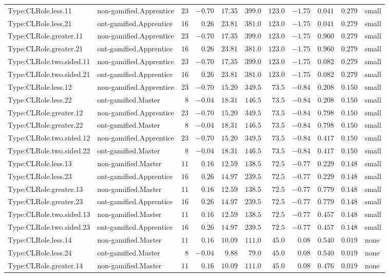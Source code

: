 \documentclass[6pt,a4paper]{article}
\begin{document}
{\begin{longtable}{llrrrrrrrrl}
Type:CLRole.less.11&non-gamified.Apprentice&$23$&$-0.70$&$17.35$&$399.0$&$123.0$&$-1.75$&$0.041$&$0.279$&small\tabularnewline
Type:CLRole.less.21&ont-gamified.Apprentice&$16$&$ 0.26$&$23.81$&$381.0$&$123.0$&$-1.75$&$0.041$&$0.279$&small\tabularnewline
Type:CLRole.greater.11&non-gamified.Apprentice&$23$&$-0.70$&$17.35$&$399.0$&$123.0$&$-1.75$&$0.960$&$0.279$&small\tabularnewline
Type:CLRole.greater.21&ont-gamified.Apprentice&$16$&$ 0.26$&$23.81$&$381.0$&$123.0$&$-1.75$&$0.960$&$0.279$&small\tabularnewline
Type:CLRole.two.sided.11&non-gamified.Apprentice&$23$&$-0.70$&$17.35$&$399.0$&$123.0$&$-1.75$&$0.082$&$0.279$&small\tabularnewline
Type:CLRole.two.sided.21&ont-gamified.Apprentice&$16$&$ 0.26$&$23.81$&$381.0$&$123.0$&$-1.75$&$0.082$&$0.279$&small\tabularnewline
Type:CLRole.less.12&non-gamified.Apprentice&$23$&$-0.70$&$15.20$&$349.5$&$ 73.5$&$-0.84$&$0.208$&$0.150$&small\tabularnewline
Type:CLRole.less.22&ont-gamified.Master&$ 8$&$-0.04$&$18.31$&$146.5$&$ 73.5$&$-0.84$&$0.208$&$0.150$&small\tabularnewline
Type:CLRole.greater.12&non-gamified.Apprentice&$23$&$-0.70$&$15.20$&$349.5$&$ 73.5$&$-0.84$&$0.798$&$0.150$&small\tabularnewline
Type:CLRole.greater.22&ont-gamified.Master&$ 8$&$-0.04$&$18.31$&$146.5$&$ 73.5$&$-0.84$&$0.798$&$0.150$&small\tabularnewline
Type:CLRole.two.sided.12&non-gamified.Apprentice&$23$&$-0.70$&$15.20$&$349.5$&$ 73.5$&$-0.84$&$0.417$&$0.150$&small\tabularnewline
Type:CLRole.two.sided.22&ont-gamified.Master&$ 8$&$-0.04$&$18.31$&$146.5$&$ 73.5$&$-0.84$&$0.417$&$0.150$&small\tabularnewline
Type:CLRole.less.13&non-gamified.Master&$11$&$ 0.16$&$12.59$&$138.5$&$ 72.5$&$-0.77$&$0.229$&$0.148$&small\tabularnewline
Type:CLRole.less.23&ont-gamified.Apprentice&$16$&$ 0.26$&$14.97$&$239.5$&$ 72.5$&$-0.77$&$0.229$&$0.148$&small\tabularnewline
Type:CLRole.greater.13&non-gamified.Master&$11$&$ 0.16$&$12.59$&$138.5$&$ 72.5$&$-0.77$&$0.779$&$0.148$&small\tabularnewline
Type:CLRole.greater.23&ont-gamified.Apprentice&$16$&$ 0.26$&$14.97$&$239.5$&$ 72.5$&$-0.77$&$0.779$&$0.148$&small\tabularnewline
Type:CLRole.two.sided.13&non-gamified.Master&$11$&$ 0.16$&$12.59$&$138.5$&$ 72.5$&$-0.77$&$0.457$&$0.148$&small\tabularnewline
Type:CLRole.two.sided.23&ont-gamified.Apprentice&$16$&$ 0.26$&$14.97$&$239.5$&$ 72.5$&$-0.77$&$0.457$&$0.148$&small\tabularnewline
Type:CLRole.less.14&non-gamified.Master&$11$&$ 0.16$&$10.09$&$111.0$&$ 45.0$&$ 0.08$&$0.540$&$0.019$&none\tabularnewline
Type:CLRole.less.24&ont-gamified.Master&$ 8$&$-0.04$&$ 9.88$&$ 79.0$&$ 45.0$&$ 0.08$&$0.540$&$0.019$&none\tabularnewline
Type:CLRole.greater.14&non-gamified.Master&$11$&$ 0.16$&$10.09$&$111.0$&$ 45.0$&$ 0.08$&$0.476$&$0.019$&none\tabularnewline

\end{longtable}}
\end{document}
